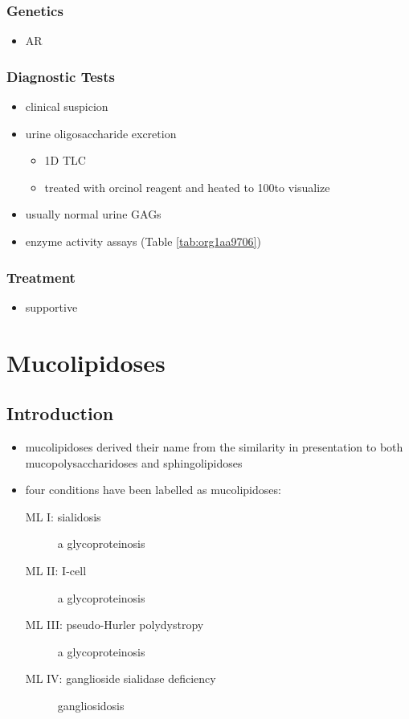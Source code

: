 \documentclass[12pt]{scrartcl}
\begin{document}
\subsubsection{Genetics}
\label{sec:org6ce71ce}
\begin{itemize}
\item AR
\end{itemize}
\subsubsection{Diagnostic Tests}
\label{sec:org44cb1ef}
\begin{itemize}
\item clinical suspicion
\item urine oligosaccharide excretion
\begin{itemize}
\item 1D TLC
\item treated with orcinol reagent and heated to 100\degreeC to visualize
\end{itemize}
\item usually normal urine GAGs
\item enzyme activity assays (Table \ref{tab:org1aa9706})
\end{itemize}

\subsubsection{Treatment}
\label{sec:orgf4b982b}
\begin{itemize}
\item supportive
\end{itemize}
\section{Mucolipidoses}
\label{sec:org1b08210}
\subsection{Introduction}
\label{sec:org79945c3}
\begin{itemize}
\item mucolipidoses derived their name from the similarity in
presentation to both mucopolysaccharidoses and sphingolipidoses
\item four conditions have been labelled as mucolipidoses:
\begin{description}
\item[{ML I: sialidosis}] a glycoproteinosis
\item[{ML II: I-cell}] a glycoproteinosis
\item[{ML III: pseudo-Hurler polydystropy}] a glycoproteinosis
\item[{ML IV: ganglioside sialidase deficiency}] gangliosidosis
\end{description}
\end{itemize}
\end{document}
